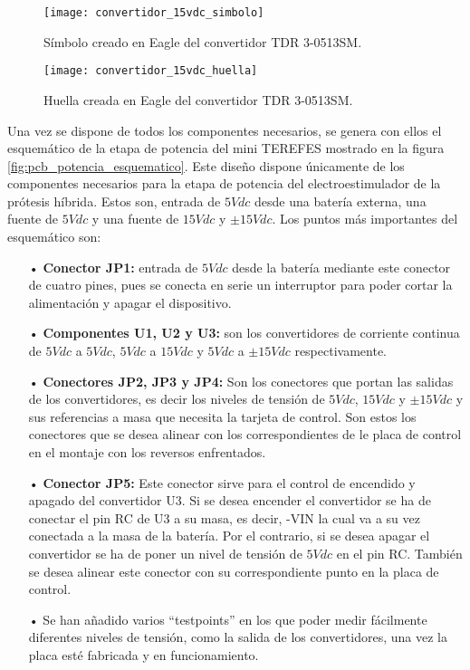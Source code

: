 \begin{figure}[!htb]
  \texttt{[image: convertidor\_15vdc\_simbolo]}
  \caption{Símbolo creado en Eagle del convertidor TDR 3-0513SM.}\label{fig:convertidor_15vdc_simbolo}
\endminipage\hfill
{}
  \texttt{[image: convertidor\_15vdc\_huella]}
  \caption{Huella creada en Eagle del convertidor TDR 3-0513SM.}\label{fig:convertidor_15vdc_huella}
\endminipage\hfill
\end{figure}

Una vez se dispone de todos los componentes necesarios, se genera con ellos el esquemático de la etapa de potencia del mini TEREFES mostrado en la figura \ref{fig:pcb_potencia_esquematico}. Este diseño dispone únicamente de los componentes necesarios para la etapa de potencia del electroestimulador de la prótesis híbrida. Estos son, entrada de $5Vdc$ desde una batería externa, una fuente de $5Vdc$ y una fuente de $15Vdc$ y $\pm15Vdc$. Los puntos más importantes del esquemático son:

\begin{itemize}
\item[•] \textbf{Conector JP1:} entrada de $5Vdc$ desde la batería mediante este conector de cuatro pines, pues se conecta en serie un interruptor para poder cortar la alimentación y apagar el dispositivo.
\item[•] \textbf{Componentes U1, U2 y U3:} son los convertidores de corriente continua de $5Vdc$ a $5Vdc$, $5Vdc$ a $15Vdc$ y $5Vdc$ a $\pm15Vdc$ respectivamente.
\item[•] \textbf{Conectores JP2, JP3 y JP4:} Son los conectores que portan las salidas de los convertidores, es decir los niveles de tensión de $5Vdc$, $15Vdc$ y $\pm15Vdc$ y sus referencias a masa que necesita la tarjeta de control. Son estos los conectores que se desea alinear con los correspondientes de le placa de control en el montaje con los reversos enfrentados.
\item[•] \textbf{Conector JP5:} Este conector sirve para el control de encendido y apagado del convertidor U3. Si se desea encender el convertidor se ha de conectar el pin RC de U3 a su masa, es decir, -VIN la cual va a su vez conectada a la masa de la batería. Por el contrario, si se desea apagar el convertidor se ha de poner un nivel de tensión de $5Vdc$ en el pin RC. También se desea alinear este conector con su correspondiente punto en la placa de control.
\item[•] Se han añadido varios ``testpoints'' en los que poder medir fácilmente diferentes niveles de tensión, como la salida de los convertidores, una vez la placa esté fabricada y en funcionamiento.
\end{itemize}


